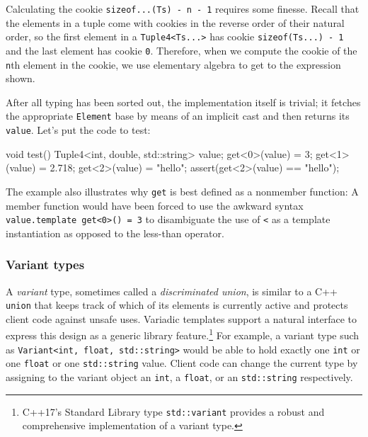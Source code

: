 \noindent Calculating the cookie
\lstinline!sizeof...(Ts)!~\lstinline!-!~\lstinline!n!~\lstinline!-!~\lstinline!1!
requires some finesse. Recall that the elements in a tuple come with
cookies in the reverse order of their natural order, so the first
element in a \lstinline!Tuple4<Ts...>! has cookie
\lstinline!sizeof(Ts...)!~\lstinline!-!~\lstinline!1! and the last element has
cookie \lstinline!0!. Therefore, when we compute the cookie of the
\lstinline!n!th element in the cookie, we use elementary algebra to get to
the expression shown.

After all typing has been sorted out, the implementation itself is
trivial; it fetches the appropriate \lstinline!Element! base by means of an
implicit cast and then returns its \lstinline!value!. Let's put the code to
test:

\begin{emcppslisting}
void test()
{
    Tuple4<int, double, std::string> value;
    get<0>(value) = 3;
    get<1>(value) = 2.718;
    get<2>(value) = "hello";
    assert(get<2>(value) == "hello");
}
\end{emcppslisting}
    

\noindent The example also illustrates why \lstinline!get! is best defined as a
nonmember function: A member function would have been forced to use the
awkward syntax
\lstinline!value.template!~\lstinline!get<0>()!~\lstinline!=!~\lstinline!3! to
disambiguate the use of \lstinline!<! as a template instantiation as
opposed to the less-than operator.

\subsubsection[Variant types]{Variant types}\label{variant-types}

A \emph{variant} type, sometimes called a \emph{discriminated union}, is
similar to a C++ \lstinline!union! that keeps track of which of its
elements is currently active and protects client code against unsafe
uses. Variadic templates support a natural interface to express this
design as a generic library feature.{\cprotect\footnote{C++17's Standard
Library type \lstinline!std::variant! provides a robust and comprehensive
  implementation of a variant type.}} For example, a variant type such
as \lstinline!Variant<int,!~\lstinline!float,!~\lstinline!std::string>! would be
able to hold exactly one \lstinline!int! or one \lstinline!float! or one
\lstinline!std::string! value. Client code can change the current type by
assigning to the variant object an \lstinline!int!, a \lstinline!float!, or an
\lstinline!std::string! respectively.

